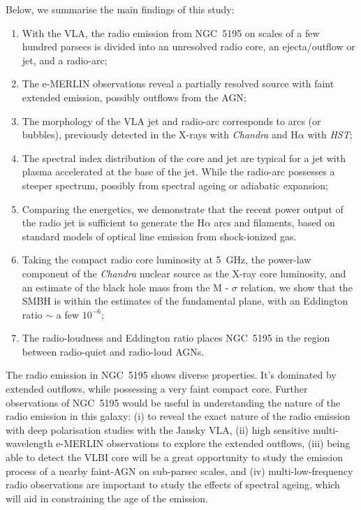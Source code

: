 \documentclass[fleqn,usenatbib]{mnras}
\begin{document}
Below, we summarise the main findings of this study:
\begin{enumerate}
\item With the VLA, the radio emission from NGC~5195 on scales of a few hundred parsecs is divided into an unresolved radio core, an ejecta/outflow or jet, and a radio-arc;
\item The e-MERLIN observations reveal a partially resolved source with faint extended emission, possibly outflows from the AGN;
\item The morphology of the VLA jet and radio-arc corresponds to arcs (or bubbles), previously detected in the X-rays with \textit{Chandra} and H$\alpha$ with \textit{HST};
\item {The spectral index distribution of the core and jet are typical for a jet with plasma accelerated at the base of the jet. While the radio-arc possesses a steeper spectrum, possibly from spectral ageing or adiabatic expansion;}
\item Comparing the energetics, we demonstrate that the recent power output of the radio jet is sufficient to generate the H$\alpha$ arcs and filaments, based on standard models of optical line emission from shock-ionized gas. 
\item Taking the compact radio core luminosity at 5~GHz, the power-law component of the {\it Chandra} nuclear source as the X-ray core luminosity,{ and an estimate of the black hole mass from the M - $\sigma$ relation,} we show that the SMBH {is within the estimates of} the fundamental plane, with an Eddington ratio $\sim$ a few $10^{-6}$;
\item {The radio-loudness and Eddington ratio places NGC~5195 in the region between radio-quiet and radio-loud AGNs.}

\end{enumerate}

{The radio emission in NGC~5195 shows diverse properties. It's dominated by extended outflows, while possessing a very faint compact core. Further observations of NGC~5195 would be useful in understanding the nature of the radio emission in this galaxy: (i) to reveal the exact nature of the radio emission with deep polarisation studies with the Jansky VLA, (ii) high sensitive multi-wavelength e-MERLIN observations to explore the extended outflows, (iii) being able to detect the VLBI core will be a great opportunity to study the emission process of a nearby faint-AGN on sub-parsec scales, and (iv) multi-low-frequency radio observations are important to study the effects of spectral ageing, which will aid in constraining the age of the emission.}
\end{document}
